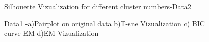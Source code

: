 \documentclass[12pt]{article}
\begin{document}
\begin{figure}[htbp]
    \centering
    \caption{Silhouette Vizualization for different cluster numbers-Data2 }
    \label{fig:foobar}
\end{figure}


\begin{figure}[htbp]
    \centering
    \caption{Data1 -a)Pairplot on original data b)T-sne Vizualization c) BIC curve EM d)EM Vizualization }
    \label{fig:foobar}
\end{figure}
\end{document}
